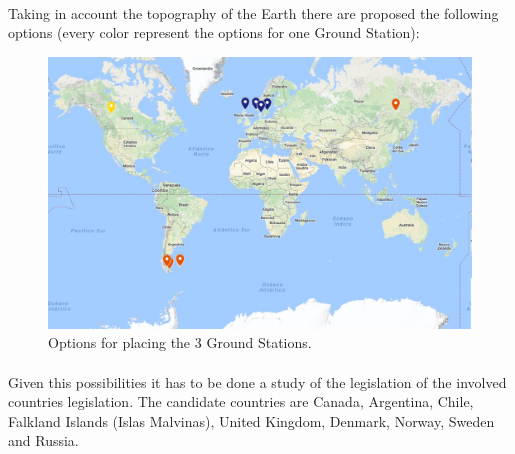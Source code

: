 \documentclass[12pt,a4paper]{report}
\begin{document}
\paragraph{}
Taking in account the topography of the Earth there are proposed the following options (every color represent the options for one Ground Station):

\begin{figure}[H]
\begin{center}
\includegraphics[scale=0.65]{Options.jpg}
\caption{Options for placing the 3 Ground Stations.}
\end{center}
\end{figure}

\paragraph{}
Given this possibilities it has to be done a study of the legislation of the involved countries legislation. The candidate countries are Canada, Argentina, Chile, Falkland Islands (Islas Malvinas), United Kingdom, Denmark, Norway, Sweden and Russia. 
\end{document}
